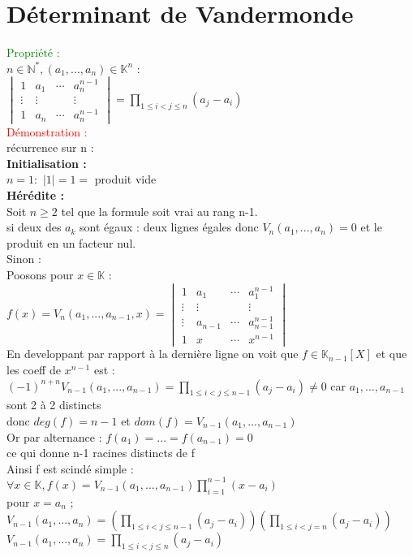 \documentclass{article}
\begin{document}
\section{Déterminant de Vandermonde}
\textcolor{green}{Propriété :} \\
$n \in \mathbb N^*,(a_1,...,a_n)\in \mathbb K^n$ : \\
$\begin{vmatrix}
1 & a_1 & \cdots & a_n^{n-1} \\
\vdots & \vdots & &\vdots \\  1 & a_n & \cdots &a_n^{n-1}  \end{vmatrix} = \prod_{1 \leq i < j \leq n}(a_j-a_i)$ \\
\textcolor{red}{Démonstration :} \\
récurrence sur n : \\
{\bf Initialisation :} \\
$n=1 :$ $|1|=1=$ produit vide \\
{\bf Hérédite :} \\
Soit $n \geq 2$ tel que la formule soit vrai au rang n-1. \\
si deux des $a_k$ sont égaux : deux lignes égales donc $V_n(a_1,...,a_n)=0$ et le produit en un facteur nul. \\
Sinon : \\
Poosons pour $x \in \mathbb K$ : \\
$f(x)=V_n(a_1,...,a_{n-1},x) = \begin{vmatrix}
1 & a_1 &\cdots &a_1^{n-1} \\
\vdots & \vdots & &\vdots \\
\vdots & a_{n-1} & \cdots & a_{n-1}^{n-1} \\
1 & x & \cdots &x^{n-1}
\end{vmatrix}$ \\
En developpant par rapport à la dernière ligne on voit que $f \in \mathbb K_{n-1}[X]$ et que les coeff de $x^{n-1}$ est : \\
$(-1)^{n+n} V_{n-1}(a_1,...,a_{n-1}) = \prod_{1 \leq i < j \leq n-1} (a_j-a_i) \neq 0$ car $a_1,...,a_{n-1}$ sont 2 à 2 distincts \\
donc $deg(f)=n-1$ et $dom(f)=V_{n-1}(a_1,...,a_{n-1})$ \\
Or par alternance : $f(a_1)=...=f(a_{n-1})=0$ \\
ce qui donne n-1 racines distincts de f \\
Ainsi f est scindé simple : \\
$\forall x \in \mathbb K, f(x)=V_{n-1}(a_1,...,a_{n-1})\prod_{i=1}^{n-1}(x-a_i)$ \\
pour $x=a_n$ ; \\
$V_{n-1}(a_1,...,a_n)= (\prod_{1 \leq i<j \leq n-1}(a_j-a_i))(\prod_{1 \leq i <j = n}(a_j-a_i))$ \\
$V_{n-1}(a_1,...,a_n)= \prod_{1 \leq i <j \leq n} (a_j-a_i)$
\end{document}
